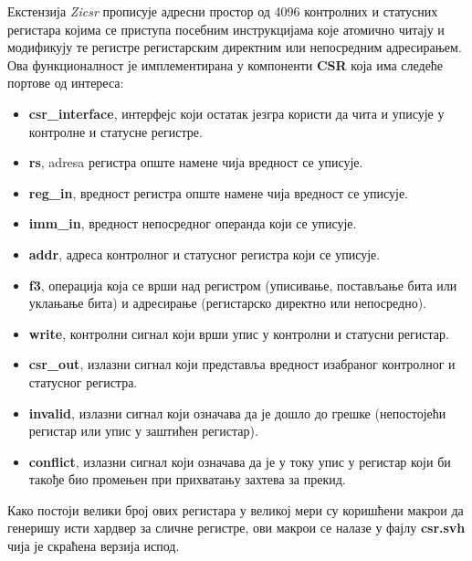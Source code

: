 Екстензија \textit{Zicsr} прописује адресни простор од 4096 контролних и статусних регистара којима се приступа посебним инструкцијама које атомично читају и модификују те регистре регистарским директним или непосредним адресирањем. Ова функционалност је имплементирана у компоненти \textbf{CSR} која има следеће портове од интереса:
\begin{itemize}
	\item \textbf{csr\_interface}, интерфејс који остатак језгра користи да чита и уписује у контролне и статусне регистре.
	\item \textbf{rs}, adresa регистра опште намене чија вредност се уписује.
	\item \textbf{reg\_in}, вредност регистра опште намене чија вредност се уписује.
	\item \textbf{imm\_in}, вредност непосредног операнда који се уписује.
	\item \textbf{addr}, адреса контролног и статусног регистра који се уписује.
	\item \textbf{f3}, операција која се врши над регистром (уписивање, постављање бита или уклањање бита) и адресирање (регистарско директно или непосредно).
	\item \textbf{write}, контролни сигнал који врши упис у контролни и статусни регистар.
	\item \textbf{csr\_out}, излазни сигнал који представља вредност изабраног контролног и статусног регистра.
	\item \textbf{invalid}, излазни сигнал који означава да је дошло до грешке (непостојећи регистар или упис у заштићен регистар).
	\item \textbf{conflict}, излазни сигнал који означава да је у току упис у регистар који би такође био промењен при прихватању захтева за прекид.
\end{itemize}

Како постоји велики број ових регистара у великој мери су коришћени макрои да генеришу исти хардвер за сличне регистре, ови макрои се налазе у фајлу \textbf{csr.svh} чија је скраћена верзија испод.


